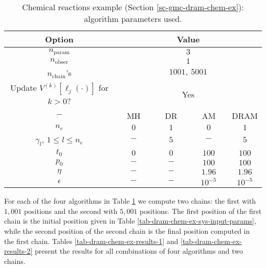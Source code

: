 \begin{table}[h!]
\begin{center}
\begin{tabular}{|c|c|c|c|c|}
\hline
Option                                            & \multicolumn{4}{c|}{Value}                                   \\
\hline
\hline
$n_{\text{param}}$                                  & \multicolumn{4}{c|}{$3$}                                     \\
\hline
$n_{\text{obser}}$                                  & \multicolumn{4}{c|}{$1$}                                     \\
\hline
$n_{\text{chain}}$'s                              & \multicolumn{4}{c|}{$1001,~5001$}                            \\
\hline
Update $V^{(k)}[\ell_j(\cdot)]$ for $k>0$?        & \multicolumn{4}{c|}{Yes}                                     \\
\hline
\hline
$-$                                               & ~~MH~~            & ~~DR~~       & ~~AM~~       & DRAM       \\
\hline
$n_e$                                             & $0$               & $1$          & $0$          & $1$        \\
\hline
$\gamma_l$,
$1\leqslant l\leqslant n_e$                       & $-$               & $5$          & $-$          & $5$        \\
\hline
\hline
$t_0$                                             & $0$               & $0$          & $100$        & $100$      \\
\hline
$p_0$                                             & $-$               & $-$          & $100$        & $100$      \\
\hline
$\eta$                                            & $-$               & $-$          & $1.96$       & $1.96$     \\
\hline
$\epsilon$                                        & $-$               & $-$          & $10^{-5}$    & $10^{-5}$  \\
\hline
\end{tabular}
\caption{Chemical reactions example (Section \ref{sc-gmc-dram-chem-ex}):
algorithm parameters used.
}
\label{tab-dram-chem-ex-alg-params}
\end{center}
\end{table}

For each of the four algorithms in Table \ref{tab-dram-chem-ex-alg-params}
we compute two chains: the first with $1,001$ positions and the second with $5,001$ positions.
The first position of the first chain is the initial position given in Table \ref{tab-dram-chem-ex-sys-input-params}, while
the second position of the second chain is the final position computed in the first chain.
Tables \ref{tab-dram-chem-ex-results-1} and \ref{tab-dram-chem-ex-results-2} present the results for all combinations of four
algorithms and two chains.

